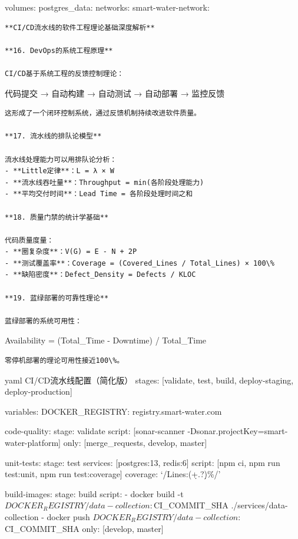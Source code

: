 volumes: postgres\_data: networks: smart-water-network:

\begin{lstlisting}
**CI/CD流水线的软件工程理论基础深度解析**

**16. DevOps的系统工程原理**

CI/CD基于系统工程的反馈控制理论：
\end{lstlisting}

代码提交 → 自动构建 → 自动测试 → 自动部署 → 监控反馈

\begin{lstlisting}
这形成了一个闭环控制系统，通过反馈机制持续改进软件质量。

**17. 流水线的排队论模型**

流水线处理能力可以用排队论分析：
- **Little定律**：L = λ × W
- **流水线吞吐量**：Throughput = min(各阶段处理能力)
- **平均交付时间**：Lead Time = 各阶段处理时间之和

**18. 质量门禁的统计学基础**

代码质量度量：
- **圈复杂度**：V(G) = E - N + 2P
- **测试覆盖率**：Coverage = (Covered_Lines / Total_Lines) × 100\%
- **缺陷密度**：Defect_Density = Defects / KLOC

**19. 蓝绿部署的可靠性理论**

蓝绿部署的系统可用性：
\end{lstlisting}

Availability = (Total\_Time - Downtime) / Total\_Time

\begin{lstlisting}
零停机部署的理论可用性接近100\%。
\end{lstlisting}

yaml  CI/CD流水线配置（简化版） stages: {[}validate, test, build, deploy-staging, deploy-production{]}

variables: DOCKER\_REGISTRY: registry.smart-water.com

code-quality: stage: validate script: {[}sonar-scanner -Dsonar.projectKey=smart-water-platform{]} only: {[}merge\_requests, develop, master{]}

unit-tests: stage: test services: {[}postgres:13, redis:6{]} script: {[}npm ci, npm run test:unit, npm run test:coverage{]} coverage: `/Lines\s*:\s*(\d+.?\d*)\%/'

build-images: stage: build script: - docker build -t \(DOCKER_REGISTRY/data-collection:\)CI\_COMMIT\_SHA ./services/data-collection - docker push \(DOCKER_REGISTRY/data-collection:\)CI\_COMMIT\_SHA only: {[}develop, master{]}

